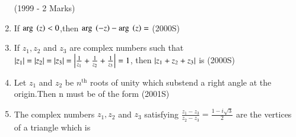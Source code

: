 \documentclass[journal]{IEEEtran}
\begin{document}
\begin{enumerate}[start=6]
\hfill{(1999 - 2 Marks)}
\begin{enumerate}
\end{enumerate}
\item If $\mathrm{arg}\ \brak{z}<0$,then $\mathrm{arg}\ \brak{-z}-\mathrm{arg}\ \brak{z}= $
\hfill{(2000S)}
\begin{enumerate}
\end{enumerate}
\item If $z_1,z_2$ and $z_3$ are complex numbers such that $\left\vert z_1\right\vert=\left\vert z_2\right\vert=\left\vert z_3\right\vert=\left\vert\frac{1}{z_1}+\frac{1}{z_2}+\frac{1}{z_3}\right\vert=1$, then $\left\vert z_1+z_2+z_3\right\vert$ is 
\hfill{(2000S)}
\begin{enumerate}
\end{enumerate}
\item Let $z_1$ and $z_2$ be $n^{\text{th}}$ roots of unity which substend a right angle at the origin.Then n must be of the form
\hfill{(2001S)}
\begin{enumerate}
\end{enumerate}
\item The complex numbers $z_1,z_2$ and $z_3$ satisfying $\frac{z_1-z_3}{z_2-z_3}=\frac{1-i\sqrt{3}}{2}$ are the vertices of a triangle which is

\end{enumerate}
\end{document}
